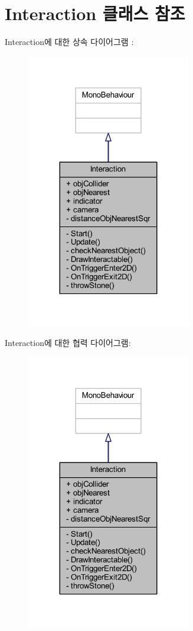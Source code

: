 \hypertarget{class_interaction}{}\section{Interaction 클래스 참조}
\label{class_interaction}


Interaction에 대한 상속 다이어그램 \+: \nopagebreak
\begin{figure}[H]
\begin{center}
\leavevmode
\includegraphics[width=203pt]{d1/d7f/class_interaction__inherit__graph}
\end{center}
\end{figure}


Interaction에 대한 협력 다이어그램\+:\nopagebreak
\begin{figure}[H]
\begin{center}
\leavevmode
\includegraphics[width=203pt]{d6/d06/class_interaction__coll__graph}
\end{center}
\end{figure}
